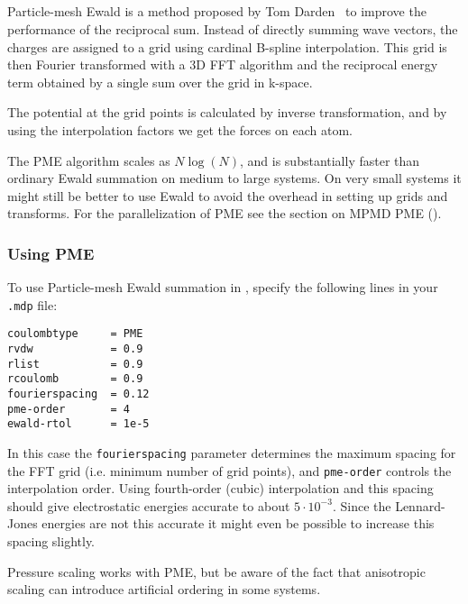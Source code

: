 \subsection{}
\label{sec:pme}
Particle-mesh Ewald is a method proposed by Tom
Darden~\cite{Darden93,Essmann95} to improve the performance of the
reciprocal sum. Instead of directly summing wave vectors, the charges
are assigned to a grid using cardinal B-spline interpolation. This
grid is then Fourier transformed with a 3D FFT algorithm and the
reciprocal energy term obtained by a single sum over the grid in
k-space.

The potential at the grid points is calculated by inverse
transformation, and by using the interpolation factors we get the
forces on each atom. 

The PME algorithm scales as $N \log(N)$, and is substantially faster
than ordinary Ewald summation on medium to large systems. On very
small systems it might still be better to use Ewald to avoid the
overhead in setting up grids and transforms.
For the parallelization of PME see the section on MPMD PME ().

\subsubsection{Using PME}
To use Particle-mesh Ewald summation in {\gromacs}, specify the
following lines in your {\tt .mdp} file:

\begin{verbatim}
coulombtype     = PME
rvdw            = 0.9
rlist           = 0.9
rcoulomb        = 0.9
fourierspacing  = 0.12
pme-order       = 4
ewald-rtol      = 1e-5
\end{verbatim}

In this case the {\tt fourierspacing} parameter determines the maximum
spacing for the FFT grid (i.e. minimum number of grid points),
and {\tt pme-order} controls the
interpolation order. Using fourth-order (cubic) interpolation and this
spacing should give electrostatic energies accurate to about
$5\cdot10^{-3}$. Since the Lennard-Jones energies are not this
accurate it might even be possible to increase this spacing slightly.

Pressure scaling works with PME, but be aware of the fact that
anisotropic scaling can introduce artificial ordering in some systems.

